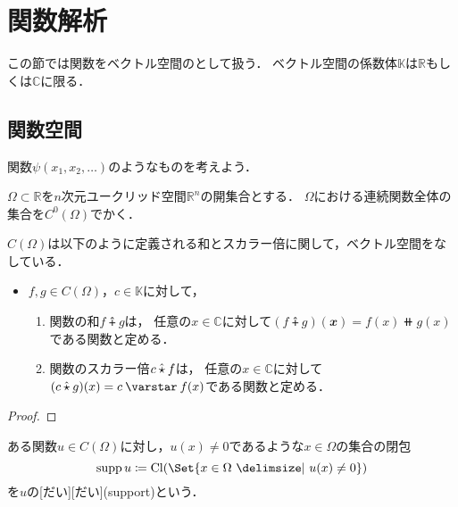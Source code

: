 \documentclass[../sotsu.tex]{subfiles}
\begin{document}
\section{関数解析}

この節では関数をベクトル空間のとして扱う．
ベクトル空間の係数体$𝕂$は$ℝ$もしくは$ℂ$に限る．

\subsection{関数空間}

関数$\psi(x_1, x_2, \dotsc)$のようなものを考えよう．

\begin{definition}
    $\Omega \subset ℝ$を$n$次元ユークリッド空間$ℝ^n$の開集合とする．
    $\Omega$における連続関数全体の集合を$C^0 (\Omega)$でかく．
\end{definition}

\begin{proposition}
    \label{thm:continuous-function-space-is-vector-space}
    $C(\Omega)$は以下のように定義される和とスカラー倍に関して，ベクトル空間をなしている．
    \begin{itemize}
        \item $f, g \in C(\Omega)$，$c \in 𝕂$に対して，
        \begin{enumerate}
            \item 関数の和$f \plushat g$は，
                任意の$x \in ℂ$に対して$ ( f \plushat g )(𝒙) = f(x) \doubleplus g(x) $である関数と定める．
            \item 関数のスカラー倍$c \mathbin{\hat{\mathbin{\star}}} f$は，
                任意の$x \in ℂ$に対して$ ( c \mathbin{\hat{\scaprod}} g )(x) = c \scaprodvar f(x) $である関数と定める．
        \end{enumerate}
    \end{itemize}
\end{proposition}

\begin{proof}
    
\end{proof}


\begin{definition}
    ある関数$u \in C(\Omega)$に対し，$u(x) \neq 0$であるような$x \in \Omega$の集合の閉包
    \begin{equation}
        \supp u  \coloneq  \cl{ \Set{  x \in \Omega  \given  u(x) \neq 0  } }
    \end{equation}
    を$u$の[だい][だい](support)という．
\end{definition}
\end{document}
